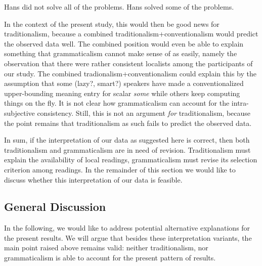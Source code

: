 \documentclass[fleqn,reqno,10pt,draft]{article}
\begin{document}
\begin{exe}
  \ex \label{bsp:indirect-SI}
    \begin{xlist}
      \ex \label{bsp:indirect-SI-Target} Hans did not solve all of the problems.
      \ex \label{bsp:indirect-SI-Inference} Hans solved some of the problems.
    \end{xlist}
\end{exe}

\noindent In the context of the present study, this would then be good
news for traditionalism, because a combined
traditionalism+conventionalism would predict the observed data
well. The combined position would even be able to explain something
that grammaticalism cannot make sense of as easily, namely the
observation that there were rather consistent localists among the
participants of our study. The combined tradionalism+conventionalism
could explain this by the assumption that some (lazy?, smart?)
speakers have made a conventionalized upper-bounding meaning entry for
scalar \emph{some} while others keep computing things on the fly. It
is not clear how grammaticalism can account for the intra-subjective
consistency. Still, this is not an argument \emph{for} traditionalism,
because the point remains that traditionalism as such fails to predict
the observed data.
  

In sum, if the interpretation of our data as suggested here is
correct, then both traditionalism and grammaticalism are in need of
revision. Traditionalism must explain the availability of local
readings, grammaticalism must revise its selection criterion among
readings. In the remainder of this section we would like to discuss
whether this interpretation of our data is feasible.

\subsection{General Discussion}
\label{sec:discussion}


In the following, we would like to address potential alternative
explanations for the present results. We will argue that besides
these interpretation variants, the main point raised
above remains valid: neither traditionalism, nor grammaticalism
is able to account for the present pattern of results.

\end{document}

